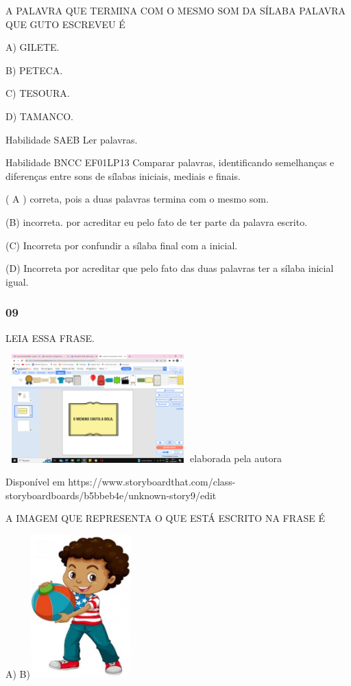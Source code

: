 A PALAVRA QUE TERMINA COM O MESMO SOM DA SÍLABA PALAVRA QUE GUTO ESCREVEU
É

A) GILETE.

B) PETECA.

C) TESOURA.

D) TAMANCO.

Habilidade SAEB Ler palavras.

Habilidade BNCC EF01LP13 Comparar palavras, identificando semelhanças e
diferenças entre sons de sílabas iniciais, mediais e finais.

( A ) correta, pois a duas palavras termina com o mesmo som.

(B) incorreta. por acreditar eu pelo fato de ter parte da palavra
escrito.

(C) Incorreta por confundir a sílaba final com a inicial.

(D) Incorreta por acreditar que pelo fato das duas palavras ter a sílaba
inicial igual.

\subsubsection{09}\label{section-34}

LEIA ESSA FRASE.

\includegraphics[width=2.80293in,height=1.64007in]{media/image198.png}elaborada
pela autora

Disponível em
https://www.storyboardthat.com/class-storyboardboards/b5bbeb4e/unknown-story9/edit

A IMAGEM QUE REPRESENTA O QUE ESTÁ ESCRITO NA FRASE É

A)
B)\includegraphics[width=1.53194in,height=2.16250in]{media/image199.jpg}

